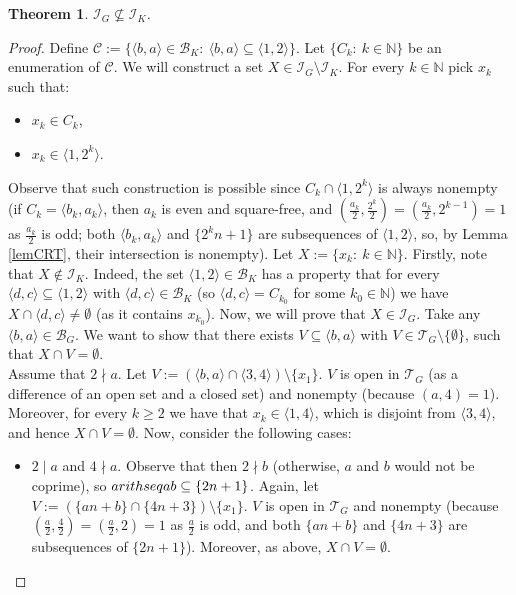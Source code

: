 \documentclass{amsart}
\newtheorem{thm}{Theorem}[section]
\theoremstyle{definition}
\newcommand{\N}{{\mathbb N}}
\newcommand{\I}{\mathcal I}
\newcommand{\T}{\mathcal{T}}
\newcommand{\B}{\mathcal{B}}
\newcommand{\arithseq}[2]{\langle#2, #1\rangle}
\begin{document}
\begin{thm}
$\I_G \not\subseteq \I_K$.
\end{thm}

\begin{proof}
Define $\mathcal{C} := \{\arithseq{a}{b}\in \B_K :\ \arithseq{a}{b}\subseteq \arithseq{2}{1}\}$. Let $\{C_k :\ k\in\N\}$ be an enumeration of $\mathcal{C}$.
We will construct a set $X \in \I_G \setminus \I_K$. For every $k\in\N$ pick $x_k$ such that:
\begin{itemize}
	\item $x_k\in C_k$,
	\item $x_k\in \arithseq{2^k}{1}$.
\end{itemize}
Observe that such construction is possible since $C_k \cap \arithseq{2^k}{1}$ is always nonempty (if $C_k = \arithseq{a_k}{b_k}$, then $a_k$ is even and square-free, and $\left(\frac{a_k}{2},\frac{2^k}{2}\right)=\left(\frac{a_k}{2},2^{k-1}\right)=1$ as $\frac{a_k}{2}$ is odd; both $\arithseq{a_k}{b_k}$ and $\{2^k n+1\}$ are subsequences of $\arithseq{2}{1}$, so, by Lemma \ref{lemCRT}, their intersection is nonempty). Let $X := \{x_k :\ k\in\N\}$.
Firstly, note that $X \notin \I_K$. Indeed, the set $\arithseq{2}{1}\in\B_K$ has a property that for every $\arithseq{c}{d}\subseteq \arithseq{2}{1}$ with $\arithseq{c}{d}\in \B_K$ (so $\arithseq{c}{d}=C_{k_0}$ for some $k_0\in\N$) we have $X\cap \arithseq{c}{d} \neq \emptyset$ (as it contains $x_{k_0}$).
Now, we will prove that $X \in \I_G$. Take any $\arithseq{a}{b}\in\B_G$. We want to show that there exists $V\subseteq \arithseq{a}{b}$ with $V\in \T_G\setminus\{\emptyset\}$, such that $X\cap V = \emptyset$. \\
Assume that $2\nmid a$. Let $V := (\arithseq{a}{b} \cap \arithseq{4}{3})\setminus\{x_1\}$. $V$ is open in $\T_G$ (as a difference of an open set and a closed set) and nonempty (because $(a,4)=1$). Moreover, for every $k\geq 2$ we have that $x_k\in \arithseq{4}{1}$, which is disjoint from $\arithseq{4}{3}$, and hence $X\cap V = \emptyset$.
Now, consider the following cases:
\begin{itemize}
 \item $2\mid a$ and $4\nmid a$. Observe that then $2 \nmid b$ (otherwise, $a$ and $b$ would not be coprime), so $\\arithseq{a}{b}\subseteq \{2n+1\}$. Again, let $V := (\{an+b\} \cap \{4n+3\})\setminus\{x_1\}$. $V$ is open in $\T_G$ and nonempty (because $\left(\frac{a}{2},\frac{4}{2}\right)=\left(\frac{a}{2},2\right)=1$ as $\frac{a}{2}$ is odd, and both $\{an+b\}$ and $\{4n+3\}$ are subsequences of $\{2n+1\}$). Moreover, as above, $X\cap V = \emptyset$.

\end{itemize}
\end{proof}
\end{document}
